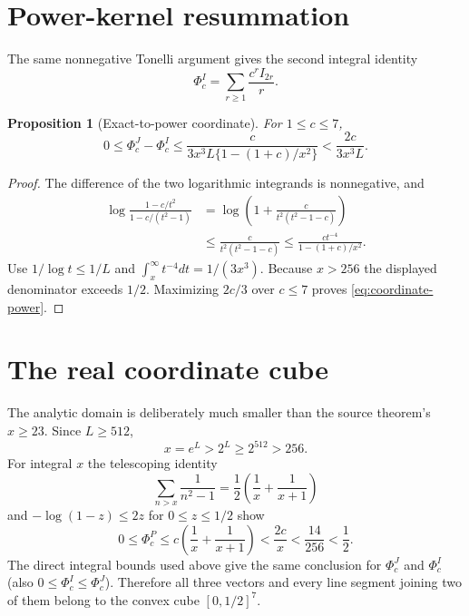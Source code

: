 \documentclass[11pt]{article}
\newtheorem{proposition}[theorem]{Proposition}
\theoremstyle{definition}
\theoremstyle{remark}
\newcommand{\PhiP}{\Phi^{P}}
\newcommand{\PhiJ}{\Phi^{J}}
\newcommand{\PhiI}{\Phi^{I}}
\begin{document}
\section{Power-kernel resummation}

The same nonnegative Tonelli argument gives the second integral identity
\begin{equation}
 \PhiI_c=\sum_{r\ge1}\frac{c^rI_{2r}}{ r}.
 \label{eq:I-tonelli}
\end{equation}

\begin{proposition}[Exact-to-power coordinate]
\label{prop:power}
For $1\le c\le7$,
\begin{equation}
 0\le\PhiJ_c-\PhiI_c
 \le \frac{c}{3x^3L\{1-(1+c)/x^2\}}
 <\frac{2c}{3x^3L}.
 \label{eq:per-c-power}
\end{equation}
\end{proposition}

\begin{proof}
The difference of the two logarithmic integrands is nonnegative, and
\begin{align*}
 \log\frac{1-c/t^2}{1-c/(t^2-1)}
 &=\log\!\left(1+\frac{c}{ t^2(t^2-1-c)}\right)\\
 &\le \frac{c}{ t^2(t^2-1-c)}
 \le \frac{ct^{-4}}{1-(1+c)/x^2}.
\end{align*}
Use $1/\log t\le1/L$ and $\int_x^\infty t^{-4}dt=1/(3x^3)$.
Because $x>256$ the displayed denominator exceeds $1/2$.  Maximizing
$2c/3$ over $c\le7$ proves \eqref{eq:coordinate-power}.
\end{proof}

\section{The real coordinate cube}
\label{sec:cube}

The analytic domain is deliberately much smaller than the source theorem's
$x\ge23$.  Since $L\ge512$,
\begin{equation}
 x=e^L>2^L\ge2^{512}>256.
 \label{eq:cube-bridge}
\end{equation}
For integral $x$ the telescoping identity
\begin{equation}
 \sum_{n>x}\frac{1}{ n^2-1}=\frac{1}{2}\left(\frac{1}{ x}+\frac{1}{ x+1}\right)
 \label{eq:integer-tail}
\end{equation}
and $-\log(1-z)\le2z$ for $0\le z\le1/2$ show
\[
 0\le\PhiP_c\le c\left(\frac{1}{ x}+\frac{1}{ x+1}\right)
 <\frac{2c}{ x}<\frac{14}{256}<\frac{1}{2}.
\]
The direct integral bounds used above give the same conclusion for
$\PhiJ_c$ and $\PhiI_c$ (also $0\le\PhiI_c\le\PhiJ_c$).  Therefore all
three vectors and every line segment joining two of them belong to the
convex cube $[0,1/2]^7$.
\end{document}
